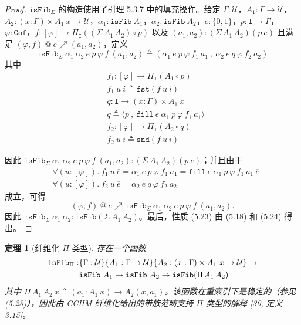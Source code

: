 \documentclass{ctexrep}
\theoremstyle{plain}
\newtheorem{theorem}{定理}[section]
\theoremstyle{definition}
\theoremstyle{remark}
\begin{document}
\begin{proof}
$\mathtt{isFib}_\Sigma$ 的构造使用了引理 5.3.7 中的填充操作。给定 $\Gamma : \mathcal{U}$，$A_1 : \Gamma \to \mathcal{U}$，$A_2 : (x : \Gamma) \times A_1\ x \to \mathcal{U}$，$\alpha_1 : \mathtt{isFib}\ A_1$，$\alpha_2 : \mathtt{isFib}\ A_2$，$e : \{0,1\}$，$p : \mathtt{I} \to \Gamma$，$\varphi : \mathtt{Cof}$，$f : [\varphi] \to \Pi_{\mathtt{I}}((\Sigma\,A_1\,A_2) \circ p)$ 以及 $(a_1, a_2) : (\Sigma\,A_1\,A_2)(p\ e)$ 且满足 $(\varphi, f)\ @\ e \nearrow (a_1, a_2)$，定义
\begin{equation}
\mathtt{isFib}_\Sigma\ \alpha_1\ \alpha_2\ e\ p\ \varphi\ f\ (a_1, a_2) \triangleq (\alpha_1\ e\ p\ \varphi\ f_1\ a_1\ ,\ \alpha_2\ e\ q\ \varphi\ f_2\ a_2)
\end{equation}
其中
\begin{align*}
&f_1 : [\varphi] \to \Pi_{\mathtt{I}}(A_1 \circ p) \\
&f_1\ u\ i \triangleq \mathtt{fst}(f\ u\ i) \\
&q : \mathtt{I} \to (x : \Gamma) \times A_1\ x \\
&q \triangleq \langle p\ ,\ \mathtt{fill}\ e\ \alpha_1\ p\ \varphi\ f_1\ a_1\rangle \\
&f_2 : [\varphi] \to \Pi_{\mathtt{I}}(A_2 \circ q) \\
&f_2\ u\ i \triangleq \mathtt{snd}(f\ u\ i)
\end{align*}

因此 $\mathtt{isFib}_\Sigma\ \alpha_1\ \alpha_2\ e\ p\ \varphi\ f\ (a_1, a_2) : (\Sigma\,A_1\,A_2)(p\ \overline{e})$；并且由于
\begin{align*}
&\forall(u : [\varphi]).\ f_1\ u\ \overline{e} = \alpha_1\ e\ p\ \varphi\ f_1\ a_1 = \mathtt{fill}\ e\ \alpha_1\ p\ \varphi\ f_1\ a_1\ \overline{e} \\
&\forall(u : [\varphi]).\ f_2\ u\ \overline{e} = \alpha_2\ e\ q\ \varphi\ f_2\ a_2
\end{align*}
成立，可得
\[
(\varphi, f)\ @\ \overline{e} \nearrow \mathtt{isFib}_\Sigma\ \alpha_1\ \alpha_2\ e\ p\ \varphi\ f\ (a_1, a_2).
\]
因此 $\mathtt{isFib}_\Sigma\ \alpha_1\ \alpha_2 : \mathtt{isFib}(\Sigma\,A_1\,A_2)$。最后，性质 (5.23) 由 (5.18) 和 (5.24) 得出。
\end{proof}

\begin{theorem}[纤维化 $\Pi$-类型]
存在一个函数
\begin{align}
\mathtt{isFib}_\Pi : &\{\Gamma : \mathcal{U}\}\{A_1 : \Gamma \to \mathcal{U}\}\{A_2 : (x : \Gamma) \times A_1\ x \to \mathcal{U}\} \to \\
&\mathtt{isFib}\ A_1 \to \mathtt{isFib}\ A_2 \to \mathtt{isFib}(\Pi\,A_1\,A_2)\notag
\end{align}
其中 $\Pi\,A_1\,A_2\ x \triangleq (a_1 : A_1\ x) \to A_2(x, a_1)$。该函数在重索引下是稳定的（参见 (5.23)），因此由 CCHM 纤维化给出的带族范畴支持 $\Pi$-类型的解释 [30, 定义 3.15]。
\end{theorem}
\end{document}
